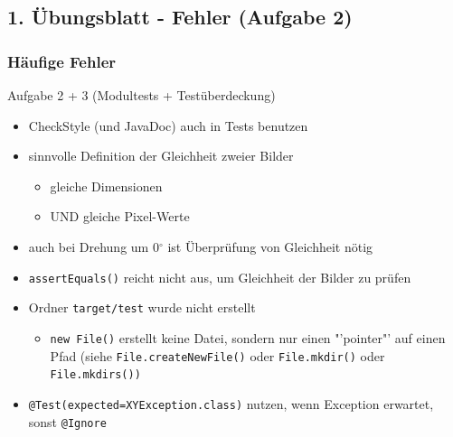 \documentclass[18pt]{beamer}
\begin{document}
	\subsection{1. Übungsblatt - Fehler (Aufgabe 2)}
	\begin{frame}
		\frametitle{Häufige Fehler}
		\begin{block}{Aufgabe 2 + 3 (Modultests + Testüberdeckung)}
			\begin{itemize}
				\item CheckStyle (und JavaDoc) auch in Tests benutzen \pause
				\item sinnvolle Definition der Gleichheit zweier Bilder
				\begin{itemize}
					\item gleiche Dimensionen
					\item UND gleiche Pixel-Werte
				\end{itemize} \pause
				\item auch bei Drehung um 0$^{\circ}$  ist Überprüfung von Gleichheit nötig \pause
				\item \texttt{assertEquals()} reicht nicht aus, um Gleichheit der Bilder zu prüfen \pause 
				\item Ordner \texttt{target/test} wurde nicht erstellt
				\begin{itemize}
					\item \texttt{new File()} erstellt keine Datei, sondern nur einen "'pointer"' auf einen Pfad (siehe \texttt{File.createNewFile()} oder \texttt{File.mkdir()} oder \texttt{File.mkdirs())} \pause
				\end{itemize}
				\item \texttt{@Test(expected=XYException.class)} nutzen, wenn Exception erwartet, sonst \texttt{@Ignore}
			\end{itemize}
		\end{block}
	\end{frame}
	
\end{document}
